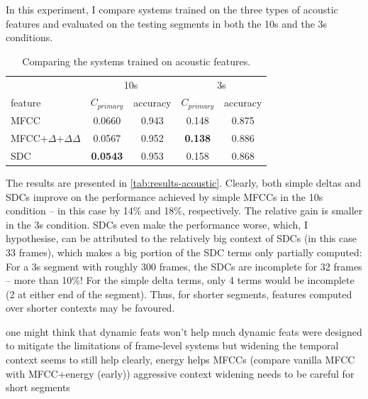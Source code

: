 \documentclass[bsc,frontabs,twoside,singlespacing,parskip,deptreport]{infthesis}
\begin{document}
{{    In this experiment, I compare systems trained on the three types of acoustic features and evaluated on the testing segments in both the 10s and the 3s conditions.

    \begin{table}[h!tb]
      \centering
      \begin{sc}
        \footnotesize
        \begin{tabular}{l|cc|cc}
                  & \multicolumn{2}{c|}{10s}  & \multicolumn{2}{c}{3s} \\
          feature & $C_{primary}$ & accuracy & $C_{primary}$ & accuracy \\
          \hline
          MFCC & 0.0660 & 0.943 & 0.148 & 0.875 \\
          MFCC+$\Delta$+$\Delta\Delta$ & 0.0567 & 0.952 & \textbf{0.138} & 0.886 \\
          SDC & \textbf{0.0543} & 0.953 & 0.158 & 0.868 \\
        \end{tabular}
      \end{sc}
      \caption{Comparing the systems trained on acoustic features.}
      \label{tab:results-acoustic}
    \end{table}

    The results are presented in \autoref{tab:results-acoustic}.
    Clearly, both simple deltas and SDCs improve on the performance achieved by simple MFCCs in the 10s condition -- in this case by 14\% and 18\%, respectively. The relative gain is smaller in the 3s condition. SDCs even make the performance worse, which, I hypothesise, can be attributed to the relatively big context of SDCs (in this case 33 frames), which makes a big portion of the SDC terms only partially computed: For a 3s segment with roughly 300 frames, the SDCs are incomplete for 32 frames -- more than 10\%! For the simple delta terms, only 4 terms would be incomplete (2 at either end of the segment). Thus, for shorter segments, features computed over shorter contexts may be favoured.


    one might think that dynamic feats won't help much
    dynamic feats were designed to mitigate the limitations of frame-level systems
    but widening the temporal context seems to still help
    clearly, energy helps MFCCs (compare vanilla MFCC with MFCC+energy (early))
    aggressive context widening needs to be careful for short segments
  }

}
\end{document}
